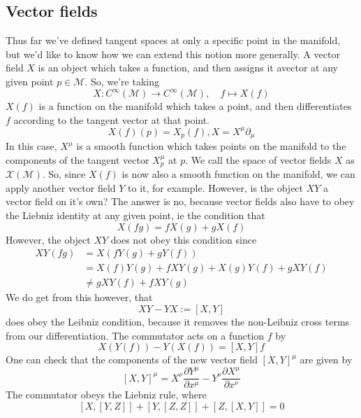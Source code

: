 \subsection{Vector fields} 
Thus far we've defined tangent spaces at only a specific point in the manifold, but we'd like to know how we can extend this notion more generally. A vector field $X$ is an object which takes a function, and then assigns it avector at any given point $p \in \mathcal{M}$. So, we're taking 
\[ 
X: C^\infty ( \mathcal{ M} ) \rightarrow C^\infty( \mathcal{M} ), \quad f \mapsto X(f) 
\]
$X(f)$ is a function on the manifold which takes a point, and then differentiates $f$ according to the tangent vector at that point. 
\[ 
X(f)( p) = X_p ( f), X = X^\mu \partial_\mu 
\] 
In this case, $X^\mu$ is a smooth function which takes points on the manifold to the components of the tangent vector $X_p^\mu$ at $p$. We call the space of vector fields $X$ as $\mathcal{ X} (\mathcal{M}) $.  
So, since $X(f)$ is now also a smooth function on the manifold, we can apply another vector field $Y$ to it, for example. However, is the object $XY$ a vector field on it's own? The answer is no, because vector fields also have to obey the Liebniz identity at any given point, ie the condition that 
\[ 
X(fg) = f X(g) + g X( f) 
\] 
However, the object $ XY$ does not obey this condition since 
\begin{align*} 
XY( fg )& = X ( f Y (g) + g Y ( f) ) \\
	&= X(f) Y(g) + f XY ( g) + X( g) Y(f) + g XY( f) \\ 
	& \neq g XY ( f) + f XY ( g) 
\end{align*} 
We do get from this however, that 
\[ 
XY  - YX := [ X, Y ] 
\]  
does obey the Leibniz condition, because it removes the non-Leibniz cross terms from our differentiation. The commutator acts on a function $f$ by 
\[ 
X( Y (  f))  - Y( X( f)) = [ X, Y] f 
\] One can check that the components of the new vector field $[ X, Y]^\mu $ are given by 
\[ 
[ X, Y]^\mu = X^\nu \frac{\partial Y^\mu}{ \partial x^\mu }  - Y^\nu \frac{ \partial X^\mu }{ \partial x^\nu } 
\]
The commutator obeys the Liebniz rule, where 
\[ 
[X , [ Y, Z]] + [ Y, [ Z, Z]] + [Z, [ X, Y]] = 0
\] 

